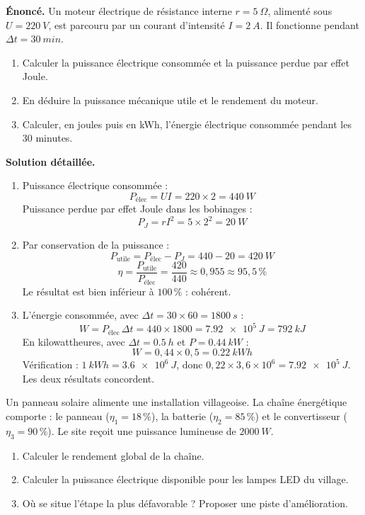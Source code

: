\documentclass[11pt]{article}
\begin{document}
\begin{exoresolu}
\textbf{Énoncé.} Un moteur électrique de résistance interne $r = \SI{5}{\Omega}$, alimenté sous $U = \SI{220}{V}$, est parcouru par un courant d'intensité $I = \SI{2}{A}$. Il fonctionne pendant $\Delta t = \SI{30}{min}$.
\begin{enumerate}
\item Calculer la puissance électrique consommée et la puissance perdue par effet Joule.
\item En déduire la puissance mécanique utile et le rendement du moteur.
\item Calculer, en joules puis en kWh, l'énergie électrique consommée pendant les 30 minutes.
\end{enumerate}
\tcblower
\textbf{Solution détaillée.}
\begin{enumerate}
\item Puissance électrique consommée :
\[ P_{\text{élec}} = U I = 220 \times 2 = \SI{440}{W} \]
Puissance perdue par effet Joule dans les bobinages :
\[ P_J = r I^2 = 5 \times 2^2 = \SI{20}{W} \]
\item Par conservation de la puissance :
\[ P_{\text{utile}} = P_{\text{élec}} - P_J = 440 - 20 = \SI{420}{W} \]
\[ \eta = \dfrac{P_{\text{utile}}}{P_{\text{élec}}} = \dfrac{420}{440} \approx 0{,}955 \approx 95,5\,\% \]
Le résultat est bien inférieur à $100\,\%$ : cohérent.
\item L'énergie consommée, avec $\Delta t = 30 \times 60 = \SI{1800}{s}$ :
\[ W = P_{\text{élec}}\,\Delta t = 440 \times 1800 = \SI{7,92e5}{J} = \SI{792}{kJ} \]
En kilowattheures, avec $\Delta t = \SI{0,5}{h}$ et $P = \SI{0,44}{kW}$ :
\[ W = 0{,}44 \times 0{,}5 = \SI{0,22}{kWh} \]
Vérification : $\SI{1}{kWh} = \SI{3,6e6}{J}$, donc $0{,}22 \times 3{,}6 \times 10^6 = \SI{7,92e5}{J}$. Les deux résultats concordent.
\end{enumerate}
\end{exoresolu}

\begin{exercice}
Un panneau solaire alimente une installation villageoise. La chaîne énergétique comporte : le panneau ($\eta_1 = 18\,\%$), la batterie ($\eta_2 = 85\,\%$) et le convertisseur ($\eta_3 = 90\,\%$). Le site reçoit une puissance lumineuse de $\SI{2000}{W}$.
\begin{enumerate}
\item Calculer le rendement global de la chaîne.
\item Calculer la puissance électrique disponible pour les lampes LED du village.
\item Où se situe l'étape la plus défavorable ? Proposer une piste d'amélioration.
\end{enumerate}
\end{exercice}
\end{document}
